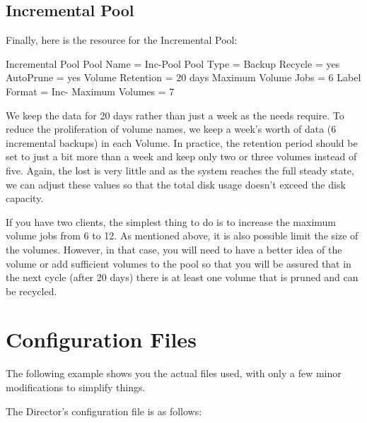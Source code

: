 \subsection{Incremental Pool}

Finally, here is the resource for the Incremental Pool:

\begin{bconfig}{Incremental Pool}
Pool {
  Name = Inc-Pool
  Pool Type = Backup
  Recycle = yes
  AutoPrune = yes
  Volume Retention = 20 days
  Maximum Volume Jobs = 6
  Label Format = Inc-
  Maximum Volumes = 7
}
\end{bconfig}

We keep the data for 20 days rather than just a week as the needs require. To
reduce the proliferation of volume names, we keep a week's worth of data (6
incremental backups) in each Volume. In practice, the retention period should
be set to just a bit more than a week and keep only two or three volumes
instead of five. Again, the lost is very little and as the system reaches the
full steady state, we can adjust these values so that the total disk usage
doesn't exceed the disk capacity.

If you have two clients, the simplest thing to do is to increase the
maximum volume jobs from 6 to 12. As mentioned above, it is also possible
limit the size of the volumes.  However, in that case, you will need to
have a better idea of the volume or add sufficient volumes to the pool so
that you will be assured that in the next cycle (after 20 days) there is
at least one volume that is pruned and can be recycled.


\section{Configuration Files}

The following example shows you the actual files used, with only a few minor
modifications to simplify things.

The Director's configuration file is as follows:

